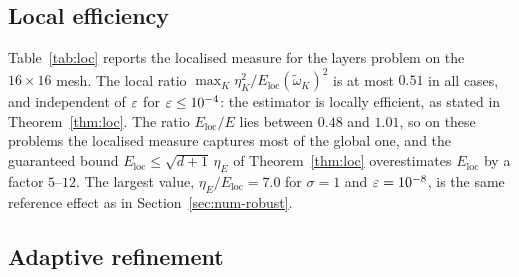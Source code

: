 

\subsection{Local efficiency}\label{sec:num-loc}

Table~\ref{tab:loc} reports the localised measure for the layers problem on the $16\times16$ mesh. The
local ratio $\max_K\eta_K^2/E_{\mathrm{loc}}(\tilde\omega_K)^2$ is at most $0.51$ in all cases, and
independent of $\varepsilon$ for $\varepsilon\le10^{-4}$: the estimator is locally efficient, as stated in
Theorem~\ref{thm:loc}. The ratio $E_{\mathrm{loc}}/E$ lies between $0.48$ and $1.01$, so on these
problems the localised measure captures most of the global one, and the guaranteed bound
$E_{\mathrm{loc}}\le\sqrt{d+1}\,\eta_E$ of Theorem~\ref{thm:loc} overestimates $E_{\mathrm{loc}}$ by a
factor $5$--$12$. The largest value, $\eta_E/E_{\mathrm{loc}}=7.0$ for $\sigma=1$ and $\varepsilon=10^{-8}$, is the
same reference effect as in Section~\ref{sec:num-robust}.



\subsection{Adaptive refinement}\label{sec:num-adapt}

